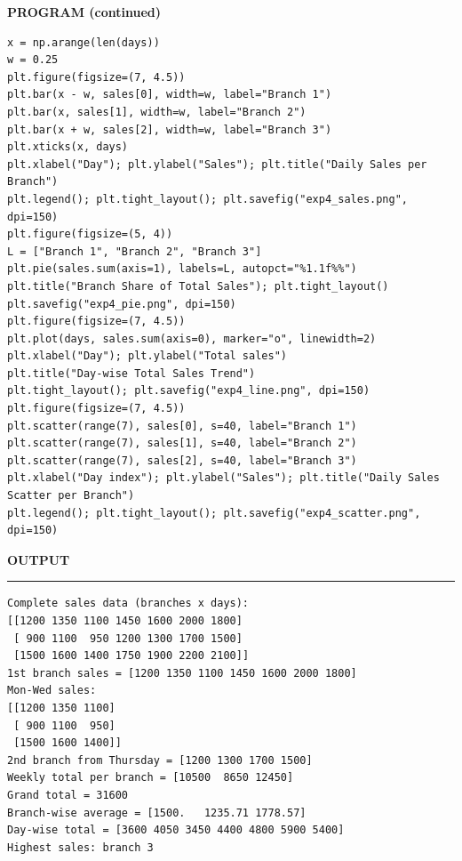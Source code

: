 \documentclass[11pt,twoside]{article}
\newcommand{\expheading}[1]{{\fontsize{14}{17}\selectfont\textbf{#1}\par}}
\newcommand{\toevenpage}{\clearpage\ifodd\value{page}\null\thispagestyle{empty}\newpage\fi}
\begin{document}
\toevenpage
\expheading{PROGRAM (continued)}
\vspace{6pt}

\begin{lstlisting}
x = np.arange(len(days))
w = 0.25
plt.figure(figsize=(7, 4.5))
plt.bar(x - w, sales[0], width=w, label="Branch 1")
plt.bar(x, sales[1], width=w, label="Branch 2")
plt.bar(x + w, sales[2], width=w, label="Branch 3")
plt.xticks(x, days)
plt.xlabel("Day"); plt.ylabel("Sales"); plt.title("Daily Sales per Branch")
plt.legend(); plt.tight_layout(); plt.savefig("exp4_sales.png", dpi=150)
plt.figure(figsize=(5, 4))
L = ["Branch 1", "Branch 2", "Branch 3"]
plt.pie(sales.sum(axis=1), labels=L, autopct="%1.1f%%")
plt.title("Branch Share of Total Sales"); plt.tight_layout()
plt.savefig("exp4_pie.png", dpi=150)
plt.figure(figsize=(7, 4.5))
plt.plot(days, sales.sum(axis=0), marker="o", linewidth=2)
plt.xlabel("Day"); plt.ylabel("Total sales")
plt.title("Day-wise Total Sales Trend")
plt.tight_layout(); plt.savefig("exp4_line.png", dpi=150)
plt.figure(figsize=(7, 4.5))
plt.scatter(range(7), sales[0], s=40, label="Branch 1")
plt.scatter(range(7), sales[1], s=40, label="Branch 2")
plt.scatter(range(7), sales[2], s=40, label="Branch 3")
plt.xlabel("Day index"); plt.ylabel("Sales"); plt.title("Daily Sales Scatter per Branch")
plt.legend(); plt.tight_layout(); plt.savefig("exp4_scatter.png", dpi=150)
\end{lstlisting}

\toevenpage
\expheading{OUTPUT}
\vspace{2pt}
\noindent\rule{\textwidth}{0.5pt}\par
\vspace{4pt}
\begin{verbatim}
Complete sales data (branches x days):
[[1200 1350 1100 1450 1600 2000 1800]
 [ 900 1100  950 1200 1300 1700 1500]
 [1500 1600 1400 1750 1900 2200 2100]]
1st branch sales = [1200 1350 1100 1450 1600 2000 1800]
Mon-Wed sales:
[[1200 1350 1100]
 [ 900 1100  950]
 [1500 1600 1400]]
2nd branch from Thursday = [1200 1300 1700 1500]
Weekly total per branch = [10500  8650 12450]
Grand total = 31600
Branch-wise average = [1500.   1235.71 1778.57]
Day-wise total = [3600 4050 3450 4400 4800 5900 5400]
Highest sales: branch 3
\end{verbatim}
\vspace{4pt}
\end{document}
